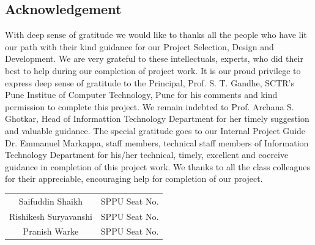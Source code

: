 \documentclass[12pt,a4paper]{report}     %
\begin{document}
\newpage	
\pagestyle{plain}
\pagestyle{fancy}							%
\renewcommand{\headrulewidth}{0pt}
\fancyfoot[LO]{\textit{}}			%
		\pagestyle{plain}           %
		\begin{center}				%
			\begin{LARGE}
	\section*{Acknowledgement}
			\end{LARGE}
		\end{center}
		\begin{normalsize}
{\setlength{\baselineskip}{1.1\baselineskip}
\noindent %
With deep sense of gratitude we would like to thanks all the people who have lit our path with their
kind guidance for our Project Selection, Design and Development. We are very grateful to these
intellectuals, experts, who did their best to help during our completion of project work.
\newline
It is our proud privilege to express deep sense of gratitude to the Principal, Prof. S. T. Gandhe,
SCTR's Pune Institue of Computer Technology, Pune for his comments and kind permission to complete this project. We
remain indebted to Prof. Archana S. Ghotkar, Head of Informattion Technology Department for her timely
suggestion and valuable guidance.
\newline
The special gratitude goes to our Internal Project Guide Dr. Emmanuel Markappa, staff members,
technical staff members of Information Technology Department for his/her technical, timely, excellent
and coercive guidance in completion of this project work. We thanks to all the class colleagues for
their appreciable, encouraging help for completion of our project.








			\vspace{1.8in}
				\begin{flushright} 
\begin{tabular}{ c c }
    Saifuddin Shaikh & SPPU Seat No. \\
    Rishikesh Suryavanshi & SPPU Seat No. \\
    Pranish Warke & SPPU Seat No. \\
\end{tabular}
 \end{flushright}

}
		\end{normalsize}
		
\end{document}
